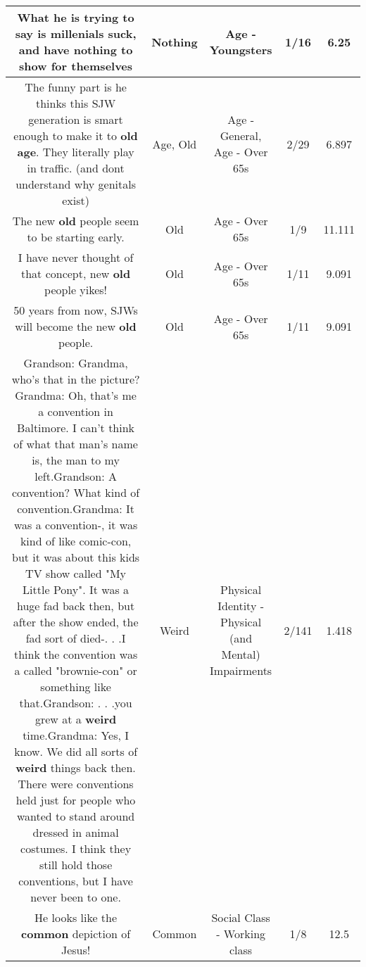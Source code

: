 \documentclass[11pt]{article}
\newlength\mylength
\begin{document}
\begin{center}
\begin{longtable}{|C{.65\mylength}|C{.30\mylength}|C{.12\mylength}|C{.12\mylength}|C{.12\mylength}|}
  \small What he is trying to say is millenials suck, and have \textbf{nothing} to show for themselves\normalsize   & Nothing & Age - Youngsters & 1/16 & 6.25 \\  \hline
  \small The funny part is he thinks this SJW generation is smart enough to make it to \textbf{old} \textbf{age}. They literally play in traffic. (and dont understand why genitals exist)\normalsize   & Age, Old & Age - General, Age - Over 65s & 2/29 & 6.897 \\  \hline
  \small The new \textbf{old} people seem to be starting early.\normalsize   & Old & Age - Over 65s & 1/9 & 11.111 \\  \hline
  \small I have never thought of that concept, new \textbf{old} people yikes!\normalsize   & Old & Age - Over 65s & 1/11 & 9.091 \\  \hline
  \small 50 years from now, SJWs will become the new \textbf{old} people.\normalsize   & Old & Age - Over 65s & 1/11 & 9.091 \\  \hline
  \small Grandson: Grandma, who's that in the picture?Grandma: Oh, that's me a convention in Baltimore. I can't think of what that man's name is, the man to my left.Grandson: A convention? What kind of convention.Grandma: It was a convention-, it was kind of like comic-con, but it was about this kids TV show called "My Little Pony". It was a huge fad back then, but after the show ended, the fad sort of died-. . .I think the convention was a called "brownie-con" or something like that.Grandson: . . .you grew at a \textbf{weird} time.Grandma: Yes, I know. We did all sorts of \textbf{weird} things back then. There were conventions held just for people who wanted to stand around dressed in animal costumes. I think they still hold those conventions, but I have never been to one.\normalsize   & Weird & Physical Identity - Physical (and Mental) Impairments & 2/141 & 1.418 \\  \hline
  \small He looks like the \textbf{common} depiction of Jesus!\normalsize   & Common & Social Class - Working class & 1/8 & 12.5 \\  \hline

\end{longtable}
\end{center}
\end{document}
